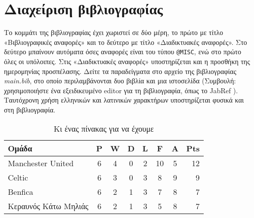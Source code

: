 \section{Διαχείριση βιβλιογραφίας}

Το κομμάτι της βιβλιογραφίας έχει χωριστεί σε δύο μέρη, το πρώτο με
τίτλο «Βιβλιογραφικές αναφορές» και το δεύτερο με τίτλο «Διαδικτυακές
αναφορές». Στο δεύτερο μπαίνουν αυτόματα όσες αναφορές είναι του τύπου
\verb|@MISC|, ενώ στο πρώτο όλες οι υπόλοιπες. Στις «Διαδικτυακές
αναφορές» υποστηρίζεται και η προσθήκη της ημερομηνίας προσπέλασης.
Δείτε τα παραδείγματα στο αρχείο της βιβλιογραφίας \emph{main.bib}, στο
οποίο περιλαμβάνονται δυο βιβλία \cite{goossens93}\cite{Syropoulos} και
μια ιστοσελίδα \cite{JABREF} (Συμβουλή: χρησιμοποιήστε ένα εξειδικευμένο
editor για τη βιβλιογραφία, όπως το JabRef \cite{JABREF}). Ταυτόχρονη
χρήση ελληνικών και λατινικών χαρακτήρων υποστηρίζεται φυσικά και στη
βιβλιογραφία.

\begin{table}
\caption{Κι ένας πίνακας για να έχουμε}
\label{tab:sampletable}
\centering
\begin{tabular}{l*{6}{c}r}
Ομάδα                & P & W & D & L & F  & A & Pts \\
\hline
Manchester United    & 6 & 4 & 0 & 2 & 10 & 5 & 12  \\
Celtic               & 6 & 3 & 0 & 3 &  8 & 9 &  9  \\
Benfica              & 6 & 2 & 1 & 3 &  7 & 8 &  7  \\
Κεραυνός Κάτω Μηλιάς & 6 & 2 & 1 & 3 &  5 & 8 &  7  \\
\end{tabular}
\end{table}
